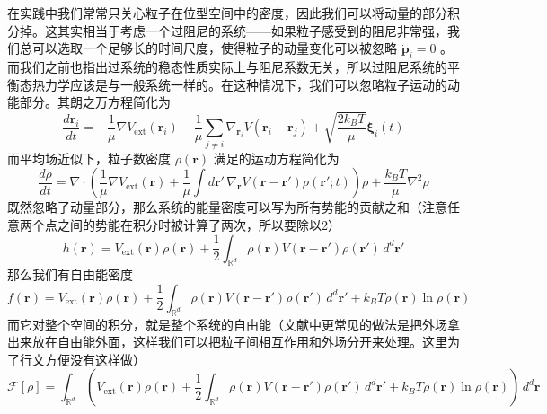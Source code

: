 \documentclass{ctexart}
\begin{document}
在实践中我们常常只关心粒子在位型空间中的密度，因此我们可以将动量的部分积分掉。这其实相当于考虑一个过阻尼的系统——如果粒子感受到的阻尼非常强，我们总可以选取一个足够长的时间尺度，使得粒子的动量变化可以被忽略 $\dot{\bm{p}}_i=0$ 。而我们之前也指出过系统的稳态性质实际上与阻尼系数无关，所以过阻尼系统的平衡态热力学应该是与一般系统一样的。在这种情况下，我们可以忽略粒子运动的动能部分。其朗之万方程简化为
\begin{equation}
\frac{d\bm{r}_i}{dt}=-\frac{1}{\mu}\nabla V_{\mathrm{ext}}(\bm{r}_i)-\frac{1}{\mu}\sum_{j\neq i}\nabla_{\bm{r}_i} V(\bm{r}_i-\bm{r}_j)+\sqrt{\frac{2 k_BT}{\mu}}\bm{\xi}_i(t)
\end{equation}
而平均场近似下，粒子数密度 $\rho(\bm{r})$ 满足的运动方程简化为
\begin{equation}
\frac{d\rho}{dt}=\nabla\cdot\left(\frac{1}{\mu}\nabla V_{\mathrm{ext}}(\bm{r})+\frac{1}{\mu}\int d\bm{r}'\,\nabla_{\bm{r}} V(\bm{r}-\bm{r}')\rho(\bm{r'};t)\right)\rho+\frac{k_BT}{\mu}\nabla^2\rho
\end{equation}
既然忽略了动量部分，那么系统的能量密度可以写为所有势能的贡献之和（注意任意两个点之间的势能在积分时被计算了两次，所以要除以2）
\begin{equation}
h(\bm{r})=V_{\mathrm{ext}}(\bm{r})\rho(\bm{r})+\frac{1}{2}\int_{\mathbb{R}^d}\rho(\bm{r}) V(\bm{r}-\bm{r}')\rho(\bm{r}')\,d^d\bm{r}'
\end{equation}
那么我们有自由能密度
\begin{equation}
f(\bm{r})=V_{\mathrm{ext}}(\bm{r})\rho(\bm{r})+\frac{1}{2}\int_{\mathbb{R}^d}\rho(\bm{r}) V(\bm{r}-\bm{r}')\rho(\bm{r}')\,d^d\bm{r}'+k_BT\rho(\bm{r})\ln\rho(\bm{r})
\end{equation}
而它对整个空间的积分，就是整个系统的自由能（文献中更常见的做法是把外场拿出来放在自由能外面，这样我们可以把粒子间相互作用和外场分开来处理。这里为了行文方便没有这样做）
\begin{equation}
\mathcal{F}[\rho]=\int_{\mathbb{R}^d}\left(V_{\mathrm{ext}}(\bm{r})\rho(\bm{r})+\frac{1}{2}\int_{\mathbb{R}^d}\rho(\bm{r}) V(\bm{r}-\bm{r}')\rho(\bm{r}')\,d^d\bm{r}'+k_BT\rho(\bm{r})\ln\rho(\bm{r})\right)\,d^d\bm{r}
\end{equation}
\end{document}
